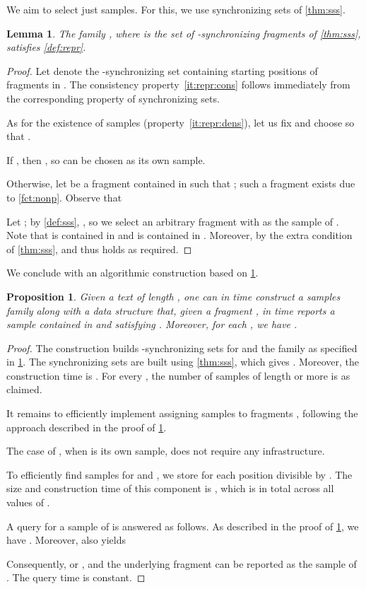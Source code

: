 \documentclass[a4paper]{article}
\newtheorem{lemma}[theorem]{Lemma}
\newtheorem{proposition}[theorem]{Proposition}
\theoremstyle{definition}
\theoremstyle{remark}
\begin{document}
We aim to select just  samples.
For this, we use synchronizing sets of \cref{thm:sss}.
\begin{lemma}\label{lem:repr}
The family ,
where  is the set of -synchronizing fragments of \cref{thm:sss}, satisfies \cref{def:repr}.
\end{lemma}
\begin{proof}
Let  denote the -synchronizing set containing starting positions of fragments in .
The consistency property~\ref{it:repr:cons} follows immediately from the 
corresponding property of synchronizing sets.

As for the existence of samples (property~\ref{it:repr:dens}),
let us fix  and choose 
so that .

If , then , so  can be chosen as its own sample.

Otherwise, let  be a fragment contained in  such that ; such a fragment  exists due to \cref{fct:nonp}.
Observe that 

Let ; by \cref{def:sss}, ,
so we select an arbitrary fragment  with  as the sample of .
Note that  is contained in  and  is contained in .
Moreover, 
by the extra condition of \cref{thm:sss}, and thus  holds as required.
\end{proof}

We conclude with an algorithmic construction based on \cref{lem:repr}.
\begin{proposition}\label{prp:repr}
Given a text  of length , one can in  time construct
a samples family  along with a data structure that,
given a fragment ,
  in  time reports a sample  contained in  and satisfying .
Moreover, for each , we have .
\end{proposition}
\begin{proof}
The construction builds -synchronizing sets 
for  and the family  as specified in \cref{lem:repr}.
The synchronizing sets are built using \cref{thm:sss}, which gives .
Moreover, the construction time is .
For every , the number of samples of length  or more
is  as claimed.

It remains to efficiently implement assigning samples
to fragments , following the approach described in the proof of \cref{lem:repr}.

The case of , when  is its own sample, does not require any infrastructure. 

To efficiently find samples for 
and , we
store  for each position  divisible by .
The size and construction time of this component is ,
which is  in total across all values of .

A query for a sample of  is answered as follows. 
As described in the proof of \cref{lem:repr}, we have . 
Moreover,  also yields 

Consequently, 
or  , and the underlying fragment can be reported 
as the sample of .
The query time is constant.
\end{proof}
\end{document}
